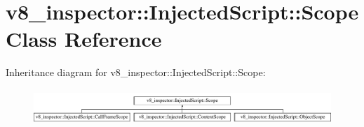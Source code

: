 \hypertarget{classv8__inspector_1_1InjectedScript_1_1Scope}{}\section{v8\+\_\+inspector\+:\+:Injected\+Script\+:\+:Scope Class Reference}
\label{classv8__inspector_1_1InjectedScript_1_1Scope}
Inheritance diagram for v8\+\_\+inspector\+:\+:Injected\+Script\+:\+:Scope\+:\begin{figure}[H]
\begin{center}
\leavevmode
\includegraphics[height=1.352657cm]{classv8__inspector_1_1InjectedScript_1_1Scope}
\end{center}
\end{figure}
